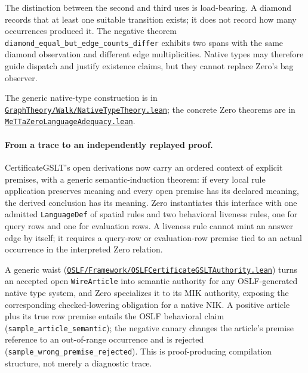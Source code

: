 \documentclass[11pt]{article}
\newcommand{\code}[1]{\texttt{#1}}
\begin{document}
The distinction between the second and third uses is load-bearing.  A
diamond records that at least one suitable transition exists; it does not
record how many occurrences produced it.  The negative theorem
\code{diamond\_equal\_but\_edge\_counts\_differ} exhibits two spans with
the same diamond observation and different edge multiplicities.  Native
types may therefore guide dispatch and justify existence claims, but they
cannot replace Zero's bag observer.

The generic native-type construction is in
\href{https://github.com/zariuq/MeTTapedia/blob/main/lean/mettapedia/Mettapedia/GraphTheory/Walk/NativeTypeTheory.lean}{\code{GraphTheory/Walk/NativeTypeTheory.lean}};
the concrete Zero theorems are in
\href{https://github.com/zariuq/MeTTapedia/blob/main/lean/mettapedia/Mettapedia/Languages/MeTTa/MeTTaZeroLanguageAdequacy.lean}{\code{MeTTaZeroLanguageAdequacy.lean}}.

\paragraph{From a trace to an independently replayed proof.}
CertificateGSLT's open derivations now carry an ordered context of explicit
premises, with a generic semantic-induction theorem: if every local rule
application preserves meaning and every open premise has its declared
meaning, the derived conclusion has its meaning.  Zero instantiates this
interface with one admitted \code{LanguageDef} of spatial rules and two
behavioral liveness rules, one for query rows and one for evaluation rows.
A liveness rule cannot mint an answer edge
by itself; it requires a query-row or evaluation-row premise tied to an
actual occurrence in the interpreted Zero relation.

A generic waist
(\href{https://github.com/zariuq/MeTTapedia/blob/main/lean/mettapedia/Mettapedia/OSLF/Framework/OSLFCertificateGSLTAuthority.lean}{\code{OSLF/Framework/OSLFCertificateGSLTAuthority.lean}})
turns an accepted open \code{WireArticle} into semantic authority for any
OSLF-generated native type system, and Zero specializes it to its MIK
authority, exposing the corresponding checked-lowering obligation for a native
NIK.  A positive article plus its true row premise entails the OSLF behavioral
claim (\code{sample\_article\_semantic}); the negative canary changes the
article's premise reference to an out-of-range occurrence and is rejected
(\code{sample\_wrong\_premise\_rejected}).  This is proof-producing compilation structure,
not merely a diagnostic trace.
\end{document}
